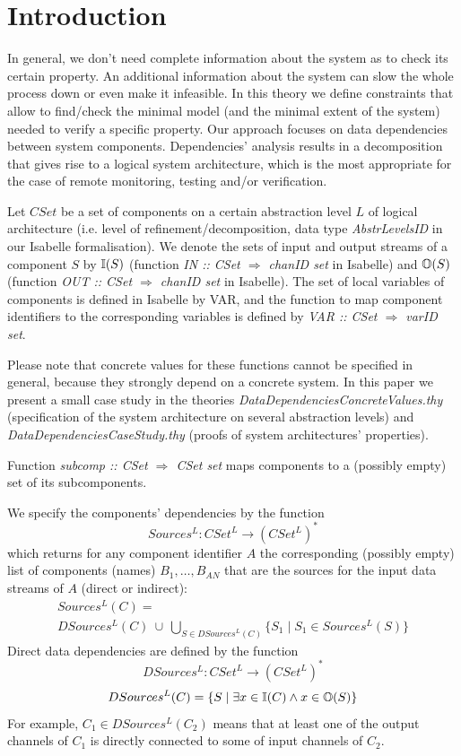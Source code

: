 \section{Introduction}
 
In general,  we don't need  complete information about the system as  
to check its certain property.  An additional information about the system can slow  the whole process
down or even make it infeasible. In this theory we define constraints that allow to find/check
the minimal model (and the minimal extent of the system)
needed to verify a specific property.  
Our approach focuses on data
dependencies between system components. Dependencies' analysis results in a
decomposition that gives rise to a logical system architecture, which is the most appropriate for the
case of remote monitoring, testing and/or verification.


Let  $CSet$  be a set of components  
on a certain abstraction level $L$ of logical architecture 
(i.e. level of refinement/decom\-po\-sition, data type \emph{AbstrLevelsID} in our Isabelle formalisation).
We denote the sets of input and
output streams of a component $S$ by $\mathbb{I}(S)$ (function \emph{ IN ::  CSet $\Rightarrow$ chanID set} in Isabelle) and
$\mathbb{O}(S)$ (function \emph{ OUT ::  CSet $\Rightarrow$ chanID set} in Isabelle).
The set of local variables of components is defined in Isabelle by VAR, and the function to map component identifiers to  the corresponding variables is defined by 
\emph{ VAR ::  CSet $\Rightarrow$ varID set}. 

Please note that concrete values for these functions cannot be specified in general, because they strongly depend on a concrete system. 
In this paper we present a small case study in the theories \emph{DataDependenciesConcreteValues.thy} (specification of the system architecture on several abstraction levels) 
and \emph{DataDependenciesCaseStudy.thy} (proofs of system architectures' properties).

Function \emph{ subcomp ::  CSet $\Rightarrow$ CSet set}  maps components to a (possibly empty) set of its subcomponents. 

We specify the components' dependencies by the  function 
\[
Sources^{L}: CSet^{L} \to  (CSet^{L})^*
\]
which returns for any component identifier $A$ the corresponding (possibly
empty) list of components (names) $B_1, \dots, B_{AN}$ that are the
sources for the input data streams of $A$ (direct or indirect):
\[
\begin{array}{l}
Sources^{L}(C) = \\
DSources^{L}(C)\ \cup\  \bigcup_{S \in  DSources^{L}(C)} \{  S_1 \mid S_1 \in  Sources^{L}(S) \} 
\end{array}
\]   
%
Direct data dependencies are defined by the function 
\[
DSources^{L}: CSet^{L} \to  (CSet^{L})^*
\]
\[ 
DSources^{L}(C) = 
\{  S \mid  \exists x \in \mathbb{I}(C) \wedge x \in \mathbb{O}(S) 
\}  
\]
\newpage 
For example, 
$C_1 \in DSources^{L}(C_2)$ means that at least one of the output channels of  $C_1$ 
is directly connected to some of input channels of   $C_2$.


